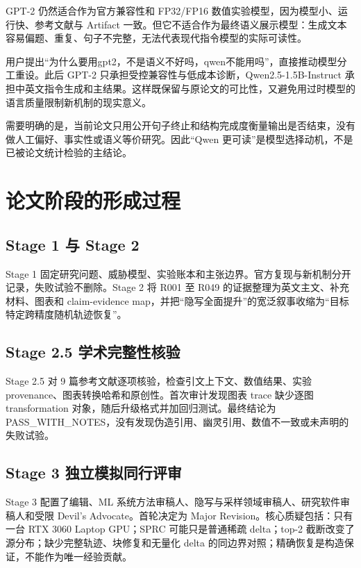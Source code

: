 \documentclass[12pt,a4paper]{article}
\begin{document}
GPT-2 仍然适合作为官方兼容性和 FP32/FP16 数值实验模型，因为模型小、运行快、参考文献与 Artifact 一致。但它不适合作为最终语义展示模型：生成文本容易偏题、重复、句子不完整，无法代表现代指令模型的实际可读性。

用户提出“为什么要用gpt2，不是语义不好吗，qwen不能用吗”，直接推动模型分工重设。此后 GPT-2 只承担受控兼容性与低成本诊断，Qwen2.5-1.5B-Instruct 承担中英文指令生成和主结果。这样既保留与原论文的可比性，又避免用过时模型的语言质量限制新机制的现实意义。

需要明确的是，当前论文只用公开句子终止和结构完成度衡量输出是否结束，没有做人工偏好、事实性或语义等价研究。因此“Qwen 更可读”是模型选择动机，不是已被论文统计检验的主结论。

\section{论文阶段的形成过程}

\subsection{Stage 1 与 Stage 2}

Stage 1 固定研究问题、威胁模型、实验账本和主张边界。官方复现与新机制分开记录，失败试验不删除。Stage 2 将 R001 至 R049 的证据整理为英文主文、补充材料、图表和 claim-evidence map，并把“隐写全面提升”的宽泛叙事收缩为“目标特定跨精度随机轨迹恢复”。

\subsection{Stage 2.5 学术完整性核验}

Stage 2.5 对 9 篇参考文献逐项核验，检查引文上下文、数值结果、实验 provenance、图表转换哈希和原创性。首次审计发现图表 trace 缺少逐图 transformation 对象，随后升级格式并加回归测试。最终结论为 PASS\_WITH\_NOTES，没有发现伪造引用、幽灵引用、数值不一致或未声明的失败试验。

\subsection{Stage 3 独立模拟同行评审}

Stage 3 配置了编辑、ML 系统方法审稿人、隐写与采样领域审稿人、研究软件审稿人和受限 Devil's Advocate。首轮决定为 Major Revision。核心质疑包括：只有一台 RTX 3060 Laptop GPU；SPRC 可能只是普通稀疏 delta；top-2 截断改变了源分布；缺少完整轨迹、块修复和无量化 delta 的同边界对照；精确恢复是构造保证，不能作为唯一经验贡献。
\end{document}
